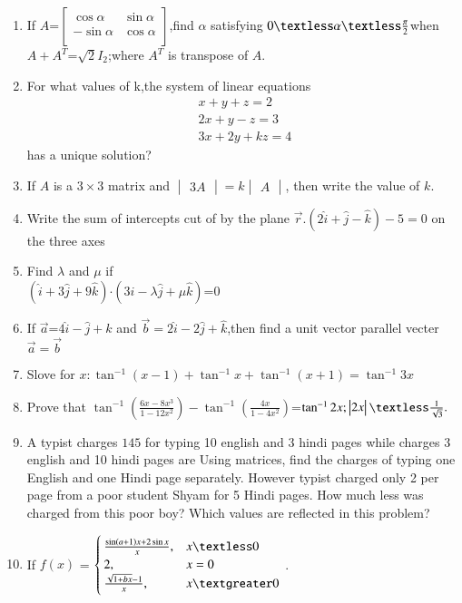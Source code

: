\documentclass[12pt,-letter paper]{article}
\providecommand{\mydet}[1]{\ensuremath{\begin{vmatrix}#1\end{vmatrix}}}
\providecommand{\myvec}[1]{\ensuremath{\begin{bmatrix}#1\end{bmatrix}}}
\providecommand{\brak}[1]{\ensuremath{\left(#1\right)}}
\begin{document}
\begin{enumerate}
	\item If $A$=$\myvec{
			\cos\alpha&\sin\alpha\\
			-\sin\alpha&\cos\alpha\\
			}$,find $\alpha$ satisfying $0\textless\alpha\textless\frac{\pi}{2}$when $A+A^T$=$\sqrt{2}$$I_{2}$;where $A^T$ is transpose of $A$.
	\item For what values of k,the system of linear equations\\\begin{align}x+y+z=2\\
2x+y-z=3\\
3x+2y+kz=4
\end{align}has a unique solution?
	
	\item If $A$ is a $3\times 3$ matrix and $\mydet{3A}=k\mydet{A}$, then write the value of $k$.
	\item Write the sum of intercepts cut of by the plane $\overset\rightarrow{r}.\brak{2\hat{i}+\hat{j}-\hat{k}}-5=0$ on the three axes

\item Find $\lambda$ and $\mu$ if\\
	$\brak{\hat{i}+3\hat{j}+9\hat{k}}$$\cdot$$\brak{3\hat{i}-\lambda\hat{j}+\mu\hat{k}}$=$0$
	
\item If $\overset\rightarrow{a}$=$4\hat{i}-\hat{j}+\hat{k}$ and $\overset\rightarrow{b}=2\hat{i}-2\hat{j}+\hat{k}$,then find a unit vector parallel vecter $\overset\rightarrow{a}=\overset\rightarrow{b}$
		
\item Slove for $x:\tan^{-1}\brak{x-1}+\tan^{-1} x+\tan^{-1}\brak{x+1}=\tan^{-1}3x$\\
		
\item	Prove that $\tan^{-1}\brak{\frac{6x-8x^3}{1-12x^2}}-\tan^{-1}\brak{\frac{4x}{1-4x^2}}$=$\tan^{-1}2x;\mydet{2x}\textless\frac{1}{\sqrt{3}}.$
	\item A typist charges \rupee $145$ for typing 10 english and 3 hindi pages while charges 3 english and 10 hindi pages are  Using matrices, find the charges of typing one English and one Hindi page separately. However typist charged only 2 per page from a poor student Shyam for 5 Hindi pages. How much less was charged from this poor boy? Which values are reflected in this problem?

	\item  If  $f\brak{x}$ = $\begin{cases}
			\frac{\sin\brak{a+1}x + 2\sin x}{x}, & x \textless 0 \\
   2, & x = 0 \\
   \frac{\sqrt{1+bx} - 1}{x}, & x \textgreater 0
    \end{cases}$
	.
	

\end{enumerate}
\end{document}
